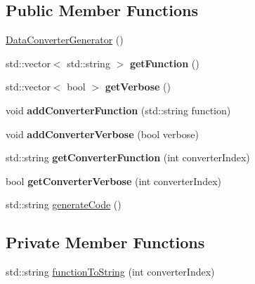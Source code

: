 \subsection*{Public Member Functions}
\begin{DoxyCompactItemize}
\item 
\hyperlink{classDataConverterGenerator_a039ab1bff2a8c13f37f994fd4e8b6c57}{Data\-Converter\-Generator} ()
\item 
\hypertarget{classDataConverterGenerator_acdf2a94539b4620df361d752133456d3}{std\-::vector$<$ std\-::string $>$ {\bfseries get\-Function} ()}\label{classDataConverterGenerator_acdf2a94539b4620df361d752133456d3}

\item 
\hypertarget{classDataConverterGenerator_ace67193c92c3b283a147682312e7a7c7}{std\-::vector$<$ bool $>$ {\bfseries get\-Verbose} ()}\label{classDataConverterGenerator_ace67193c92c3b283a147682312e7a7c7}

\item 
\hypertarget{classDataConverterGenerator_a4cfb90e1a29cca7c12e7c93920df4d0d}{void {\bfseries add\-Converter\-Function} (std\-::string function)}\label{classDataConverterGenerator_a4cfb90e1a29cca7c12e7c93920df4d0d}

\item 
\hypertarget{classDataConverterGenerator_a07715c14eac58aaf162f5b7ff36d5ba9}{void {\bfseries add\-Converter\-Verbose} (bool verbose)}\label{classDataConverterGenerator_a07715c14eac58aaf162f5b7ff36d5ba9}

\item 
\hypertarget{classDataConverterGenerator_a1507dd8a542780ffeb277a2bf0a4fbba}{std\-::string {\bfseries get\-Converter\-Function} (int converter\-Index)}\label{classDataConverterGenerator_a1507dd8a542780ffeb277a2bf0a4fbba}

\item 
\hypertarget{classDataConverterGenerator_af74c8edbedcf06eaf33fdccbc6beddac}{bool {\bfseries get\-Converter\-Verbose} (int converter\-Index)}\label{classDataConverterGenerator_af74c8edbedcf06eaf33fdccbc6beddac}

\item 
std\-::string \hyperlink{classDataConverterGenerator_a1c3df6e22d230512a9091184f315b9ef}{generate\-Code} ()
\end{DoxyCompactItemize}
\subsection*{Private Member Functions}
\begin{DoxyCompactItemize}
\item 
std\-::string \hyperlink{classDataConverterGenerator_a64845e3ce285461b22eabb32af5899ff}{function\-To\-String} (int converter\-Index)
\end{DoxyCompactItemize}
